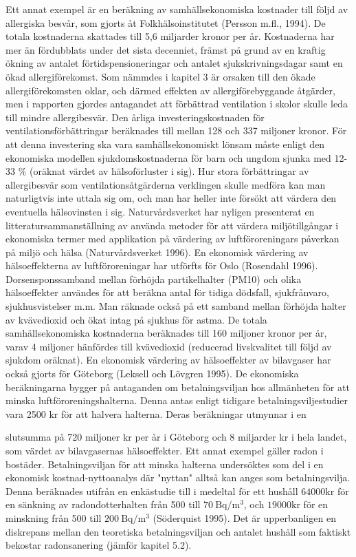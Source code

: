Ett annat exempel är en beräkning av samhällsekonomiska kostnader till följd av allergiska besvår, som gjorts åt Folkhälsoinstitutet (Persson m.fl., 1994). De totala kostnaderna skattades till 5,6 miljarder kronor per år. Kostnaderna har mer än fördubblats under det sista decenniet, främst på grund av en kraftig ökning av antalet förtidspensioneringar och antalet sjukskrivningsdagar samt en ökad allergiförekomst. Som nämmdes i kapitel 3 är orsaken till den ökade allergiförekomsten oklar, och därmed effekten av allergiförebyggande åtgärder, men i rapporten gjordes antagandet att förbättrad ventilation i skolor skulle leda till mindre allergibesvär. Den årliga investeringskostnaden för ventilationsförbättringar beräknades till mellan 128 och 337 miljoner kronor. För att denna investering ska vara samhällsekonomiskt lönsam måste enligt den ekonomiska modellen sjukdomskostnaderna för barn och ungdom sjunka med 12-33 \% (oräknat värdet av hälsoförluster i sig). Hur stora förbättringar av allergibesvär som ventilationsåtgärderna verklingen skulle medföra kan man naturligtvis inte uttala sig om, och man har heller inte försökt att värdera den eventuella hälsovinsten i sig.
Naturvårdsverket har nyligen presenterat en litteratursammanställning av använda metoder för att värdera miljötillgångar i ekonomiska termer med applikation på värdering av luftföroreningars påverkan på miljö och hälsa (Naturvårdsverket 1996).
En ekonomisk värdering av hälsoeffekterna av luftföroreningar har utförfts för Oslo (Rosendahl 1996). Dorsensponssamband mellan förhöjda partikelhalter (PM10) och olika hälsoeffekter användes för att beräkna antal för tidiga dödsfall, sjukfrånvaro, sjukhusvistelser m.m. Man räknade också på ett samband mellan förhöjda halter av kvävedioxid och ökat intag på sjukhus för astma. De totala samhällsekonomiska kostnaderna beräknades till 160 miljoner kronor per år, varav 4 miljoner hänfördes till kvävedioxid (reducerad livskvalitet till följd av sjukdom oräknat).
En ekonomisk värdering av hälsoeffekter av bilavgaser har också gjorts för Göteborg (Leksell och Lövgren 1995). De ekonomiska beräkningarna bygger på antaganden om betalningsviljan hos allmänheten för att minska luftföroreningshalterna. Denna antas enligt tidigare betalningsviljestudier vara 2500 kr för att halvera halterna. Deras beräkningar utmynnar i en

slutsumma på 720 miljoner kr per år i Göteborg och 8 miljarder kr i hela landet, som värdet av bilavgasernas hälsoeffekter.
Ett annat exempel gäller radon i bostäder. Betalningsviljan för att minska halterna undersöktes som del i en ekonomisk kostnad-nyttoanalys där "nyttan" alltså kan anges som betalningsvilja. Denna beräknades utifrån en enkästudie till i medeltal för ett hushåll \(64000 \mathrm{kr}\) för en sänkning av radondotterhalten från 500 till \(70 \mathrm{~Bq} / \mathrm{m}^{3}\), och \(19000 \mathrm{kr}\) för en minskning från 500 till \(200 \mathrm{~Bq} / \mathrm{m}^{3}\) (Söderquist 1995). Det är upperbanligen en diskrepans mellan den teoretiska betalningsviljan och antalet hushåll som faktiskt bekostar radonsanering (jämför kapitel 5.2).
